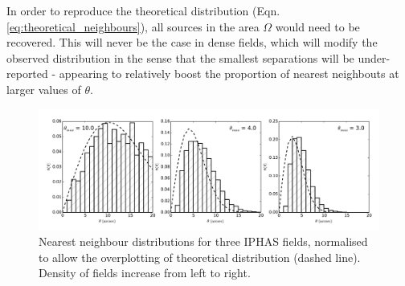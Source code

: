 \documentclass[a4paper,useAMS,usenatbib]{mn2e}
\begin{document}


In order to reproduce the theoretical distribution (Eqn. \ref{eq:theoretical_neighbours}), all sources in 
the area $\Omega$ would need to be recovered. This will never be the case in dense fields, which will modify the 
observed distribution in the sense that the smallest separations will be under-reported - appearing to relatively
boost the proportion of nearest neighbouts at larger values of $\theta$.

\begin{figure}
\begin{center}
\includegraphics[width=1\textwidth]{figures/neighbours_aquila.pdf} 
\caption{\footnotesize Nearest neighbour distributions for three IPHAS fields, 
normalised to allow the overplotting of theoretical distribution (dashed line).
 Density of fields increase from left to right.}
\label{fig:iphasfield_neighbours}
\end{center}
\end{figure}
\end{document}
